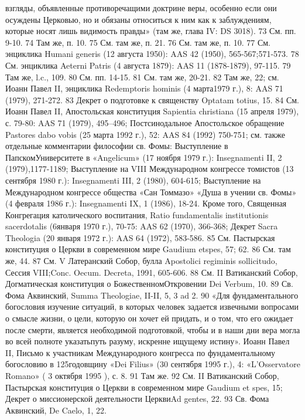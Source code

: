 \documentclass[a5paper,10pt]{article}
\begin{document}
взгляды, объявленные противоречащими доктрине веры, особенно если они осуждены Церковью, но и обязаны относиться к ним как к заблуждениям, которые носят лишь видимость правды» (там же, глава IV: DS 3018).
73 См. пп. 9-10.
74 Там же, п. 10.
75 См. там же, п. 21.
76 См. там же, п. 10.
77 См. энциклика Humani generis (12 августа 1950): AAS 42 (1950), 565-567;571-573.
78 См. энциклика Aeterni Patris (4 августа 1879): AAS 11 (1878-1879), 97-115.
79 Там же, l.c., 109.
80 См. пп. 14-15.
81 См. там же, 20-21.
82 Там же, 22; см. Иоанн Павел II, энциклика Redemptoris hominis (4 марта1979 г.), 8: AAS 71 (1979), 271-272.
83 Декрет о подготовке к священству Optatam totius, 15.
84 См. Иоанн Павел II, Апостольская конституция Sapientia christiana (15 апреля 1979), с. 79-80: AAS 71 (1979), 495–496; Постсинодальное Апостольское обращение Pastores dabo vobis (25 марта 1992 г.), 52: AAS 84 (1992) 750-751; см. также отдельные комментарии философии св. Фомы: Выступление в ПапскомУниверситете в «Angelicum» (17 ноября 1979 г.): Insegnamenti II, 2 (1979),1177-1189; Выступление на VIII Международном конгрессе томистов (13 сентября 1980 г.): Insegnamenti III, 2 (1980), 604-615; Выступление на Международном конгрессе общества «Сан Томмазо» «Душа в учении св. Фомы» (4 февраля 1986 г.): Insegnamenti IX, 1 (1986), 18-24. Кроме того, Священная Конгрегация католического воспитания, Ratio fundamentalis institutionis sacerdotalis (6января 1970 г.), 70-75: AAS 62 (1970), 366-368; Декрет Sacra Theologia (20 января 1972 г.): AAS 64 (1972), 583-586.
85 См. Пастырская конституция о Церкви в современном мире Gaudium etspes, 57; 62.
86 См. там же, 44.
87 См. V Латеранский Собор, булла Apostolici regiminis sollicitudo, Сессия VIII;Conc. Oecum. Decreta, 1991, 605-606.
88 См. II Ватиканский Собор, Догматическая конституция о БожественномОткровении Dei Verbum, 10.
89 Св. Фома Аквинский, Summa Theologiae, II-II, 5, 3 ad 2.
90 «Для фундаментального богословия изучение ситуаций, в которых человек задается извечными вопросами о смысле жизни, о цели, которую он хочет ей придать, и о том, что его ожидает после смерти, является необходимой подготовкой, чтобы и в наши дни вера могла во всей полноте указатьпуть разуму, искренне ищущему истину». Иоанн Павел II, Письмо к участникам Международного конгресса по фундаментальному богословию в 125годовщину «Dei Filius» (30 сентября 1995 г.), 4: «L'Osservatore Romano» ( 3 октября 1995 ), с. 8.
91 Там же.
92 См. II Ватиканский Собор, Пастырская конституция о Церкви в современном мире Gaudium et spes, 15; Декрет о миссионерской деятельности ЦерквиAd gentes, 22.
93 Св. Фома Аквинский, De Caelo, 1, 22.
\end{document}
